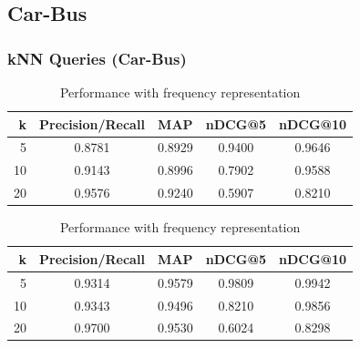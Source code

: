 \documentclass{beamer}
\begin{document}
\subsection{Car-Bus}

\begin{frame}
\frametitle{kNN Queries (Car-Bus)} 
\begin{block}{} \vspace{-3mm}
\begin{table}[!htbp]
{\footnotesize
\centering
\begin{tabular}{rcccc}
 	{\bf k } 	& {\bf Precision/Recall}	&	{\bf MAP}	 & {\bf nDCG@5}	& {\bf nDCG@10} \\ \midrule
 	5   		& 		0.8781   	 	&	0.8929	 & 0.9400			& 0.9646	\\ \midrule
	10   		& 		0.9143    	 	&	0.8996	 & 0.7902			& 0.9588	\\ \midrule
 	20  		&   		0.9576   		&	0.9240	 & 0.5907  		& 0.8210	\\ \bottomrule 
\end{tabular} 
\caption{\footnotesize Performance with binary representation} \vspace{3mm}

\centering
\begin{tabular}{rcccc}
 	{\bf k } 	& {\bf Precision/Recall}	&	{\bf MAP}	 & {\bf nDCG@5}	& {\bf nDCG@10} \\ \midrule
 	5   		& 	0.9314   		 	&	0.9579	& 0.9809			& 0.9942	\\ \midrule
	10   		& 	0.9343    		 	&	0.9496	& 0.8210			& 0.9856	\\ \midrule
 	20  		&   	0.9700   			&	0.9530	& 0.6024  			& 0.8298	\\ \bottomrule 
\end{tabular} 
\caption{\footnotesize Performance with frequency representation}
\label{table: car-bus binary} 
}
\end{table}
\end{block}
\end{frame}
\end{document}
